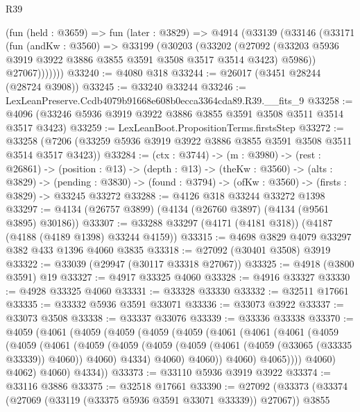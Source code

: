 \begin{lexlean}{R39}
\begin{coremodule}
      (fun (held : @3659) =>
      fun (later : @3829) =>
      @4914
        (@33139
          (@33146
            (@33171
              (fun (andKw : @3560) =>
              @33199
                (@30203
                  (@33202
                    (@27092
                      (@33203 @5936 @3919 @3922 @3886 @3855 @3591 @3508 @3517 @3514 @3423)
                      @5986))
                  @27067)))))))
@33240 := @4080 @318
@33244 := @26017 (@3451 @28244 (@28724 @3908))
@33245 := @33240 @33244
@33246 := LexLeanPreserve.Ccdb4079b91668e608b0ecca3364cda89.R39.__fits_9
@33258 := @4096 (@33246 @5936 @3919 @3922 @3886 @3855 @3591 @3508 @3511 @3514 @3517 @3423)
@33259 := LexLeanBoot.PropositionTerms.firstsStep
@33272 := @33258 (@7206 (@33259 @5936 @3919 @3922 @3886 @3855 @3591 @3508 @3511 @3514 @3517 @3423))
@33284 := (ctx : @3744) ->
  (m : @3980) ->
  (rest : @26861) ->
  (position : @13) ->
  (depth : @13) ->
  (theKw : @3560) ->
  (alts : @3829) ->
  (pending : @3830) -> (found : @3794) -> (ofKw : @3560) -> (firsts : @3829) -> @33245 @33272
@33288 := @4126 @318 @33244 @33272 @1398
@33297 := @4134 (@26757 @3899) (@4134 (@26760 @3897) (@4134 (@9561 @3895) @30186))
@33307 := @33288 @33297 (@4171 (@4181 @318)) (@4187 (@4188 (@4189 @1398) @33244 @4159))
@33315 := @4698 @3829 @4079 @33297 @382 @433 @1396 @4060 @3835
@33318 := @27092 (@30401 @3508) @3919
@33322 := @33039 (@29947 (@30117 @33318 @27067))
@33325 := @4918 (@3800 @3591) @19
@33327 := @4917 @33325 @4060
@33328 := @4916 @33327
@33330 := @4928 @33325 @4060
@33331 := @33328 @33330
@33332 := @32511 @17661
@33335 := @33332 @5936 @3591 @33071
@33336 := @33073 @3922
@33337 := @33073 @3508
@33338 := @33337 @33076
@33339 := @33336 @33338
@33370 := @4059
    (@4061
      (@4059
        (@4059
          (@4059
            (@4059
              (@4061
                (@4061
                  (@4061
                    (@4059
                      (@4059
                        (@4061
                          (@4059
                            (@4059
                              (@4059
                                (@4059 (@4061 (@4059 (@33065 (@33335 @33339)) @4060)) @4060)
                                @4334)
                              @4060)
                            @4060))
                        @4060)
                      @4065))))
              @4060)
            @4062)
          @4060)
        @4334))
@33373 := @33110 @5936 @3919 @3922
@33374 := @33116 @3886
@33375 := @32518 @17661
@33390 := @27092
    (@33373
      (@33374 (@27069 (@33119 (@33375 @5936 @3591 @33071 @33339)) @27067))
      @3855

\end{coremodule}
\end{lexlean}
